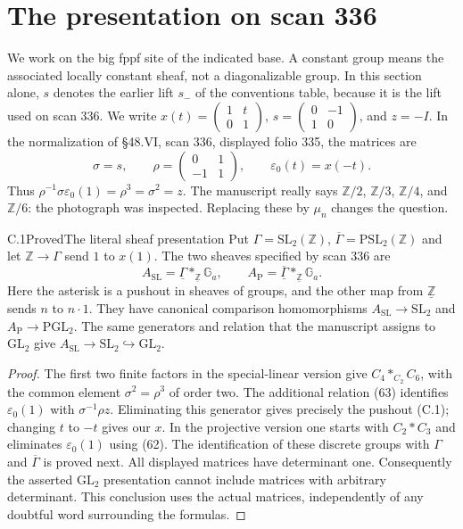\section{The presentation on scan 336}

We work on the big fppf site of the indicated base. A constant group
means the associated locally constant sheaf, not a diagonalizable group.
In this section alone, $s$ denotes the earlier lift $s_-$ of the
conventions table, because it is the lift used on scan 336.
We write $x(t)=\left(\begin{smallmatrix}1&t\\0&1\end{smallmatrix}\right)$,
$s=\left(\begin{smallmatrix}0&-1\\1&0\end{smallmatrix}\right)$, and
$z=-I$. In the normalization of \S48.VI, scan 336, displayed folio 335,
the matrices are
\[
 \sigma=s,\qquad \rho=\begin{pmatrix}0&1\\-1&1\end{pmatrix},
 \qquad \varepsilon _0(t)=x(-t).
\]
Thus $\rho^{-1}\sigma\varepsilon _0(1)=\rho^3=\sigma^2=z$.
The manuscript really says $\mathbb Z/2$, $\mathbb Z/3$, $\mathbb Z/4$,
and $\mathbb Z/6$: the photograph was inspected. Replacing these by
$\mu_n$ changes the question.

\begin{statement}{C.1}{Proved}{The literal sheaf presentation}
Put $\Gamma=\mathrm{SL}_2(\mathbb Z)$, $\overline\Gamma=
\mathrm{PSL}_2(\mathbb Z)$ and let $\mathbb Z\to\Gamma$ send $1$ to
$x(1)$. The two sheaves specified by scan 336 are
\[
 A_{\mathrm{SL}}=\underline\Gamma*_{\underline{\mathbb Z}}\mathbb G_a,
 \qquad A_{\mathrm P}=
 \underline{\overline\Gamma}*_{\underline{\mathbb Z}}\mathbb G_a.       \tag{C.1}
\]
Here the asterisk is a pushout in sheaves of groups, and the other map
from $\underline{\mathbb Z}$ sends $n$ to $n\cdot1$.
They have canonical comparison homomorphisms
$A_{\mathrm{SL}}\to\mathrm{SL}_2$ and $A_{\mathrm P}\to\mathrm{PGL}_2$.
The same generators and relation that the manuscript assigns to
$\mathrm{GL}_2$ give $A_{\mathrm{SL}}\to\mathrm{SL}_2\hookrightarrow
\mathrm{GL}_2$.
\end{statement}
\begin{proof}
The first two finite factors in the special-linear version give
$C_4*_{C_2}C_6$, with the common element
$\sigma^2=\rho^3$ of order two. The additional relation (63) identifies
$\varepsilon _0(1)$ with $\sigma^{-1}\rho z$. Eliminating this generator
gives precisely the pushout (C.1); changing $t$ to $-t$ gives our $x$.
In the projective version one starts with $C_2*C_3$ and eliminates
$\varepsilon _0(1)$ using (62). The identification of these discrete
groups with $\Gamma$ and $\overline\Gamma$ is proved next.
All displayed matrices have determinant one. Consequently the asserted
$\mathrm{GL}_2$ presentation cannot include matrices with arbitrary
determinant. This conclusion uses the actual matrices, independently
of any doubtful word surrounding the formulas.
\end{proof}

